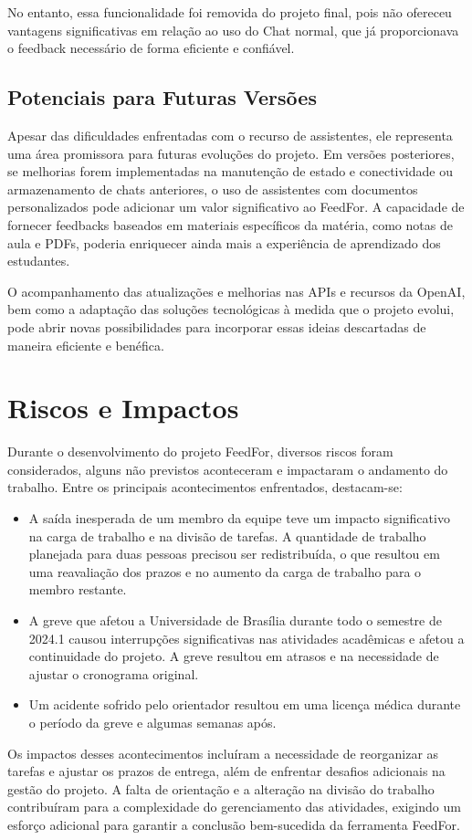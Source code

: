 No entanto, essa funcionalidade foi removida do projeto final, pois não ofereceu vantagens significativas em relação ao uso do Chat normal, que já proporcionava o feedback necessário de forma eficiente e confiável.

\subsection{Potenciais para Futuras Versões}

Apesar das dificuldades enfrentadas com o recurso de assistentes, ele representa uma área promissora para futuras evoluções do projeto. Em versões posteriores, se melhorias forem implementadas na manutenção de estado e conectividade ou armazenamento de chats anteriores, o uso de assistentes com documentos personalizados pode adicionar um valor significativo ao FeedFor. A capacidade de fornecer feedbacks baseados em materiais específicos da matéria, como notas de aula e PDFs, poderia enriquecer ainda mais a experiência de aprendizado dos estudantes.

O acompanhamento das atualizações e melhorias nas APIs e recursos da OpenAI, bem como a adaptação das soluções tecnológicas à medida que o projeto evolui, pode abrir novas possibilidades para incorporar essas ideias descartadas de maneira eficiente e benéfica.

\section{Riscos e Impactos}

Durante o desenvolvimento do projeto FeedFor, diversos riscos foram considerados, alguns não previstos aconteceram e impactaram o andamento do trabalho. Entre os principais acontecimentos enfrentados, destacam-se:

\begin{itemize}
    \item A saída inesperada de um membro da equipe teve um impacto significativo na carga de trabalho e na divisão de tarefas. A quantidade de trabalho planejada para duas pessoas precisou ser redistribuída, o que resultou em uma reavaliação dos prazos e no aumento da carga de trabalho para o membro restante.
    \item A greve que afetou a Universidade de Brasília durante todo o semestre de 2024.1 causou interrupções significativas nas atividades acadêmicas e afetou a continuidade do projeto. A greve resultou em atrasos e na necessidade de ajustar o cronograma original.
    \item Um acidente sofrido pelo orientador resultou em uma licença médica durante o período da greve e algumas semanas após.
\end{itemize}

Os impactos desses acontecimentos incluíram a necessidade de reorganizar as tarefas e ajustar os prazos de entrega, além de enfrentar desafios adicionais na gestão do projeto. A falta de orientação e a alteração na divisão do trabalho contribuíram para a complexidade do gerenciamento das atividades, exigindo um esforço adicional para garantir a conclusão bem-sucedida da ferramenta FeedFor.
